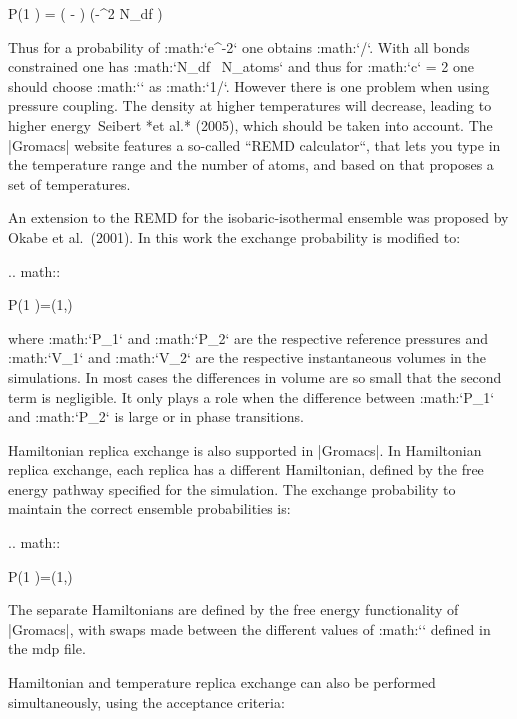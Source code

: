{   P(1 )
     = \exp\left( - \right)
   \approx \exp\left(-\epsilon^2  N_{df} \right)

Thus for a probability of :math:`e^{-2}` one obtains
:math:`\epsilon {}/`. With all bonds constrained
one has :math:`N_{df} \, N_{atoms}` and thus for :math:`c` = 2
one should choose :math:`\epsilon` as :math:`1/`.
However there is one problem when using pressure coupling. The density
at higher temperatures will decrease, leading to higher energy Seibert
*et al.* (2005), which should be taken into account. The |Gromacs| website
features a so-called ``REMD calculator``, that lets you type in the
temperature range and the number of atoms, and based on that proposes a
set of temperatures.

An extension to the REMD for the isobaric-isothermal ensemble was
proposed by Okabe et al. (2001). In this work the
exchange probability is modified to:

.. math::

   P(1 )=\min\left(1,\exp{} \right)

where :math:`P_1` and :math:`P_2` are the respective reference
pressures and :math:`V_1` and :math:`V_2` are the respective
instantaneous volumes in the simulations. In most cases the differences
in volume are so small that the second term is negligible. It only plays
a role when the difference between :math:`P_1` and :math:`P_2` is large
or in phase transitions.

Hamiltonian replica exchange is also supported in |Gromacs|. In
Hamiltonian replica exchange, each replica has a different Hamiltonian,
defined by the free energy pathway specified for the simulation. The
exchange probability to maintain the correct ensemble probabilities is:

.. math::

   P(1 )=\min\left(1,\exp{}
   \right)

The separate Hamiltonians are defined by the free energy functionality
of |Gromacs|, with swaps made between the different values of
:math:`\lambda` defined in the mdp file.

Hamiltonian and temperature replica exchange can also be performed
simultaneously, using the acceptance criteria:

}
